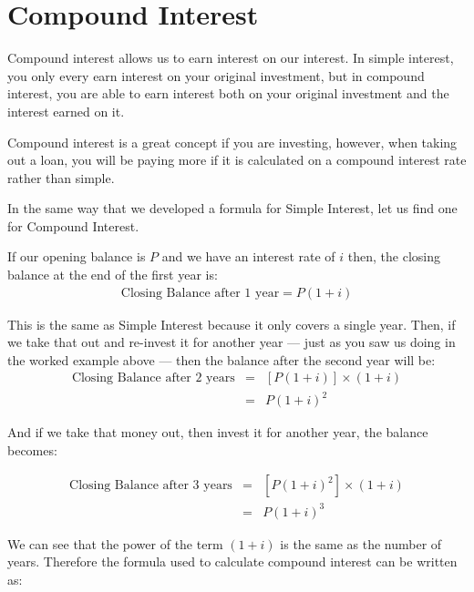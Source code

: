 \section{Compound Interest}

Compound interest allows us to earn interest on our interest. In simple interest, you only every earn interest on your original investment, but in compound interest, you are able to earn interest both on your original investment and the interest earned on it.\par

Compound interest is a great concept if you are investing, however, when taking out a loan, you will be paying more if it is calculated on a compound interest rate rather than simple.




In the same way that we developed a formula for Simple Interest, let us find one for Compound Interest.\par

If our opening balance is $P$ and we have an interest rate of $i$ then, the closing balance at the end of the first year is:
\begin{eqnarray*}
    \text{Closing Balance after 1 year} = P(1 + i)
\end{eqnarray*}

This is the same as Simple Interest because it only covers a single year. Then, if we take that out and re-invest it for another year --- just as you saw us doing in the worked example above --- then the balance after the second year will be:
\begin{eqnarray*}
    \text{Closing Balance after 2 years} &=& [P(1 + i)] \times (1 + i)\\
    &=& P(1 + i)^2
\end{eqnarray*}

And if we take that money out, then invest it for another year, the balance becomes:

\begin{eqnarray*}
    \text{Closing Balance after 3 years} &=& [P(1 + i)^2] \times (1 + i)\\
    &=& P(1 + i)^3
\end{eqnarray*}

We can see that the power of the term $(1 + i)$ is the same as the number of years. Therefore the formula used to calculate compound interest can be written as:


